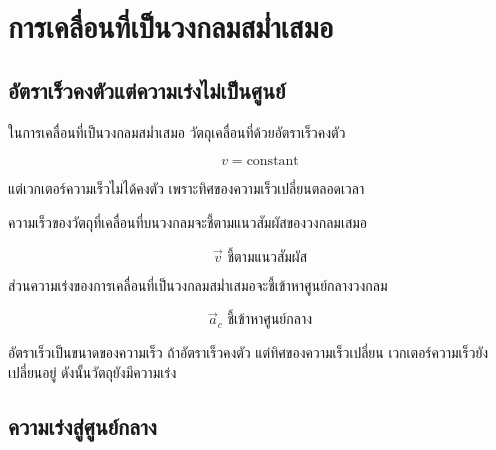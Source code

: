\newpage{}

\section{การเคลื่อนที่เป็นวงกลมสม่ำเสมอ}

\subsection{อัตราเร็วคงตัวแต่ความเร่งไม่เป็นศูนย์}

ในการเคลื่อนที่เป็นวงกลมสม่ำเสมอ วัตถุเคลื่อนที่ด้วยอัตราเร็วคงตัว

\[
v=\text{constant}
\]

แต่เวกเตอร์ความเร็วไม่ได้คงตัว เพราะทิศของความเร็วเปลี่ยนตลอดเวลา

ความเร็วของวัตถุที่เคลื่อนที่บนวงกลมจะชี้ตามแนวสัมผัสของวงกลมเสมอ

\[
\vec{v} \text{ ชี้ตามแนวสัมผัส}
\]

ส่วนความเร่งของการเคลื่อนที่เป็นวงกลมสม่ำเสมอจะชี้เข้าหาศูนย์กลางวงกลม

\[
\vec{a}_c \text{ ชี้เข้าหาศูนย์กลาง}
\]

\begin{center}
\end{center}

\begin{tcolorbox}[title=ข้อควรจำ]
อัตราเร็วเป็นขนาดของความเร็ว ถ้าอัตราเร็วคงตัว แต่ทิศของความเร็วเปลี่ยน เวกเตอร์ความเร็วยังเปลี่ยนอยู่ ดังนั้นวัตถุยังมีความเร่ง
\end{tcolorbox}

\subsection{ความเร่งสู่ศูนย์กลาง}

